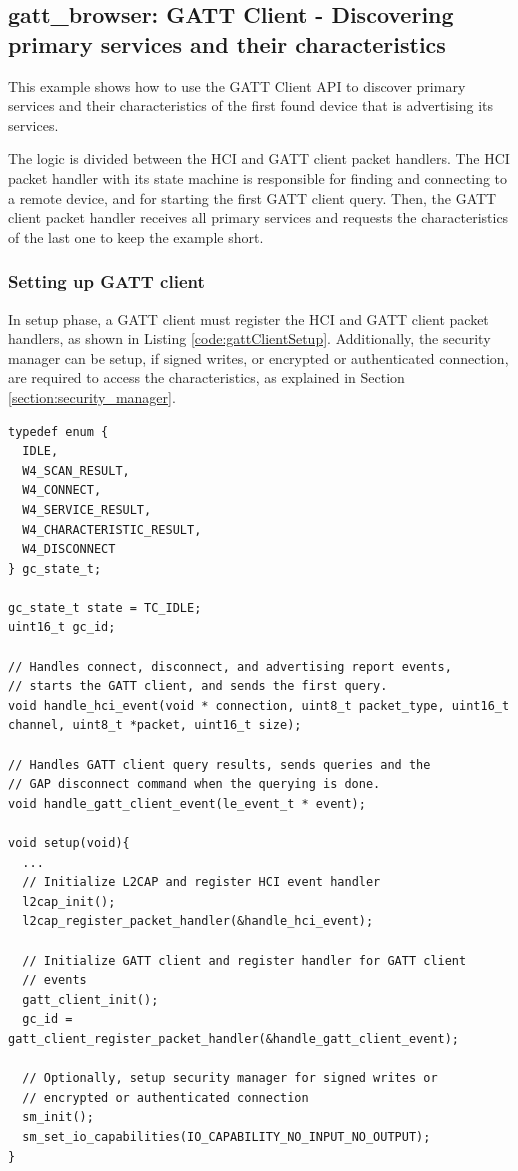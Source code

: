 \documentclass[a4paper,titlepage,oneside,12pt]{amsart} %
\begin{document}
\subsection {gatt\_browser: GATT Client - Discovering primary services and their characteristics}
\label{example:gatt_browser}
This example shows how to use the GATT Client API to discover primary services and their characteristics of the first found device that is advertising its services.

The logic is divided between the HCI and GATT client packet handlers. The HCI packet handler with its state machine is responsible for finding and connecting to a remote device, and for starting the first GATT client query. Then, the GATT client packet handler receives all primary services and requests the characteristics of the last one to keep the example short.

\subsubsection{Setting up GATT client}
In setup phase, a GATT client must register the HCI and GATT client packet handlers, as shown in Listing \ref{code:gattClientSetup}. Additionally, the security manager can be setup, if signed writes, or encrypted or authenticated connection, are required to access the characteristics, as explained in Section \ref{section:security_manager}.  

\begin{lstlisting}[caption= Setting up GATT client., label=code:gattClientSetup]
typedef enum {
  IDLE,
  W4_SCAN_RESULT,
  W4_CONNECT,
  W4_SERVICE_RESULT,
  W4_CHARACTERISTIC_RESULT,
  W4_DISCONNECT
} gc_state_t;

gc_state_t state = TC_IDLE;
uint16_t gc_id;

// Handles connect, disconnect, and advertising report events,  
// starts the GATT client, and sends the first query.
void handle_hci_event(void * connection, uint8_t packet_type, uint16_t channel, uint8_t *packet, uint16_t size);

// Handles GATT client query results, sends queries and the 
// GAP disconnect command when the querying is done.
void handle_gatt_client_event(le_event_t * event);

void setup(void){
  ...
  // Initialize L2CAP and register HCI event handler
  l2cap_init();
  l2cap_register_packet_handler(&handle_hci_event);

  // Initialize GATT client and register handler for GATT client
  // events
  gatt_client_init();
  gc_id = gatt_client_register_packet_handler(&handle_gatt_client_event);  
  
  // Optionally, setup security manager for signed writes or 
  // encrypted or authenticated connection
  sm_init();
  sm_set_io_capabilities(IO_CAPABILITY_NO_INPUT_NO_OUTPUT);
}
\end{lstlisting}
\end{document}
